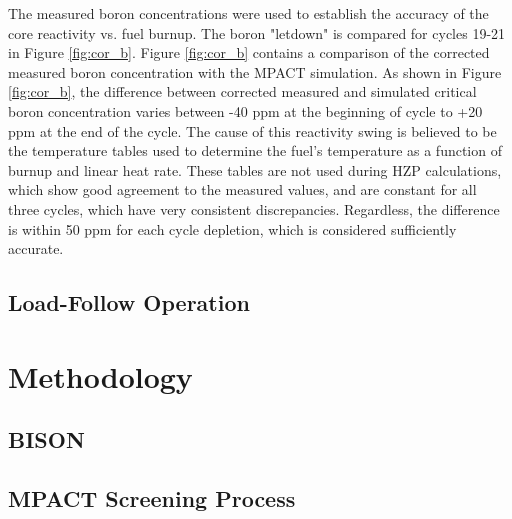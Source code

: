 \documentclass[edeposit,fullpage,12pt]{uiucthesis2009}
\begin{document}
The measured boron concentrations were used to establish the accuracy of the core reactivity vs. fuel burnup. 
The boron "letdown" is compared for cycles 19-21 in Figure \ref{fig:cor_b}. 
Figure \ref{fig:cor_b} contains a comparison of the corrected measured boron concentration with the MPACT simulation. 
As shown in Figure \ref{fig:cor_b}, the difference between corrected measured and simulated critical boron concentration varies between -40 ppm at the beginning of cycle to +20 ppm at the end of the cycle. 
The cause of this reactivity swing is believed to be the temperature tables used to determine the fuel's temperature as a function of burnup and linear heat rate.
These tables are not used during \gls{HZP} calculations, which show good agreement to the measured values, and are constant for all three cycles, which have very consistent discrepancies.
Regardless, the difference is within 50 ppm for each cycle depletion, which is considered sufficiently accurate.



\section{Load-Follow Operation}

\chapter{Methodology}

\section{BISON}

\section{MPACT Screening Process}
\end{document}
